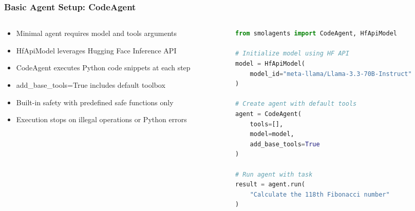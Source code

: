 \begin{frame}[fragile]\frametitle{Basic Agent Setup: CodeAgent}
\begin{columns}
\begin{column}{0.5\textwidth}
      \begin{itemize}
	\item Minimal agent requires model and tools arguments
	\item HfApiModel leverages Hugging Face Inference API
	\item CodeAgent executes Python code snippets at each step
	\item add\_base\_tools=True includes default toolbox
	\item Built-in safety with predefined safe functions only
	\item Execution stops on illegal operations or Python errors
	  \end{itemize}
\end{column}
\begin{column}{0.5\textwidth}
\begin{lstlisting}[language=Python, basicstyle=\tiny]
from smolagents import CodeAgent, HfApiModel

# Initialize model using HF API
model = HfApiModel(
    model_id="meta-llama/Llama-3.3-70B-Instruct"
)

# Create agent with default tools
agent = CodeAgent(
    tools=[], 
    model=model, 
    add_base_tools=True
)

# Run agent with task
result = agent.run(
    "Calculate the 118th Fibonacci number"
)
\end{lstlisting}
\end{column}
\end{columns}
\end{frame}

